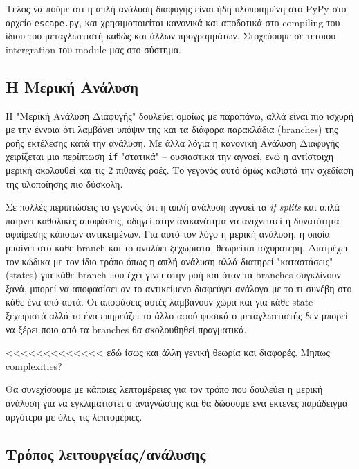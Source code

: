 Τέλος να πούμε ότι η απλή ανάλυση διαφυγής είναι ήδη υλοποιημένη στο PyPy στο
αρχείο \texttt{escape.py}, και χρησιμοποιείται κανονικά και αποδοτικά στο
compiling του ίδιου του μεταγλωττιστή καθώς και άλλων προγραμμάτων. Στοχεύουμε
σε τέτοιου intergration του module μας στο σύστημα.


\subsection{Η Μερική Ανάλυση}

Η "Μερική Ανάλυση Διαφυγής" δουλεύει ομοίως με παραπάνω, αλλά είναι πιο ισχυρή
με την έννοια ότι λαμβάνει υπόψιν της και τα διάφορα παρακλάδια (branches) της
ροής εκτέλεσης κατά την ανάλυση. Με άλλα λόγια η κανονική Ανάλυση Διαφυγής
χειρίζεται μια περίπτωση \texttt{if} "στατικά" – ουσιαστικά την αγνοεί, ενώ η
αντίστοιχη μερική ακολουθεί και τις 2 πιθανές ροές. Το γεγονός αυτό όμως
καθιστά την σχεδίαση της υλοποίησης πιο δύσκολη.

Σε πολλές περιπτώσεις το γεγονός ότι η απλή ανάλυση αγνοεί τα \textit{if splits}
και απλά παίρνει καθολικές αποφάσεις, οδηγεί στην ανικανότητα να ανιχνευτεί η
δυνατότητα αφαίρεσης κάποιων αντικειμένων. Για αυτό τον λόγο η μερική ανάλυση, η
οποία μπαίνει στο κάθε branch και το αναλύει ξεχωριστά, θεωρείται ισχυρότερη.
Διατρέχει τον κώδικα με τον ίδιο τρόπο όπως η απλή ανάλυση αλλά διατηρεί
"καταστάσεις" (states) για κάθε branch που έχει γίνει στην ροή και όταν τα
branches συγκλίνουν ξανά, μπορεί να αποφασίσει αν το αντικείμενο διαφεύγει
ανάλογα με το τι συνέβη στο κάθε ένα από αυτά. Οι αποφάσεις αυτές λαμβάνουν χώρα
και για κάθε state ξεχωριστά αλλά το ένα επηρεάζει το άλλο αφού φυσικά ο
μεταγλωττιστής δεν μπορεί να ξέρει ποιο από τα branches θα ακολουθηθεί
πραγματικά.

<<<<<<<<<<<<< εδώ ίσως και άλλη γενική θεωρία και διαφορές. Μηπως complexities?

Θα συνεχίσουμε με κάποιες λεπτομέρειες για τον τρόπο που δουλεύει η μερική
ανάλυση για να εγκλιματιστεί ο αναγνώστης και θα δώσουμε ένα εκτενές παράδειγμα
αργότερα με όλες τις λεπτομέριες.


\subsection{Τρόπος λειτουργείας/ανάλυσης}

